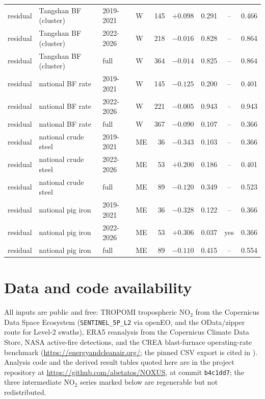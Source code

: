 \documentclass[11pt,a4paper]{article}
\providecommand{\ce}[1]{\ensuremath{\mathrm{#1}}}
\newcommand{\repocommit}{\texttt{b4c1dd7}}
\begin{document}
\begin{table}[h]
\begin{tabular}{@{}llllrrrcr@{}}
\addlinespace
residual & Tangshan BF (cluster) & 2019-2021 & W & 145 & $+0.098$ & 0.291 & -- & 0.466 \\
residual & Tangshan BF (cluster) & 2022-2026 & W & 218 & $-0.016$ & 0.828 & -- & 0.864 \\
residual & Tangshan BF (cluster) & full & W & 364 & $-0.014$ & 0.825 & -- & 0.864 \\
\addlinespace
residual & national BF rate & 2019-2021 & W & 145 & $-0.125$ & 0.200 & -- & 0.401 \\
residual & national BF rate & 2022-2026 & W & 221 & $-0.005$ & 0.943 & -- & 0.943 \\
residual & national BF rate & full & W & 367 & $-0.090$ & 0.107 & -- & 0.366 \\
\addlinespace
residual & national crude steel & 2019-2021 & ME & 36 & $-0.343$ & 0.103 & -- & 0.366 \\
residual & national crude steel & 2022-2026 & ME & 53 & $+0.200$ & 0.186 & -- & 0.401 \\
residual & national crude steel & full & ME & 89 & $-0.120$ & 0.349 & -- & 0.523 \\
\addlinespace
residual & national pig iron & 2019-2021 & ME & 36 & $-0.328$ & 0.122 & -- & 0.366 \\
residual & national pig iron & 2022-2026 & ME & 53 & $+0.306$ & 0.037 & yes & 0.366 \\
residual & national pig iron & full & ME & 89 & $-0.110$ & 0.415 & -- & 0.554 \\
\bottomrule
\end{tabular}
\end{table}

\section*{Data and code availability}
All inputs are public and free: TROPOMI tropospheric \ce{NO_2} from the Copernicus Data Space
Ecosystem (\texttt{SENTINEL\_5P\_L2} via openEO, and the OData/zipper route for Level-2 swaths),
ERA5 reanalysis from the Copernicus Climate Data Store, NASA active-fire detections, and the CREA
blast-furnace operating-rate benchmark
(\url{https://energyandcleanair.org/}; the pinned CSV export is cited in
\citealp{crea_steel_benchmark}). Analysis code and the derived result tables quoted here are in
the project repository at \url{https://github.com/abetatos/NOXUS}, at commit \repocommit; the
three intermediate \ce{NO_2} series marked below are regenerable but not redistributed.
\end{document}
